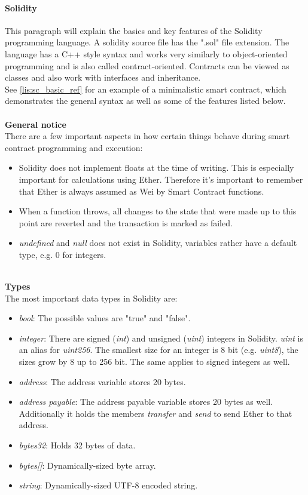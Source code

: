 \paragraph{Solidity}
This paragraph will explain the basics and key features of the Solidity programming language.
A solidity source file has the ".sol" file extension. The language has a C++ style syntax and works very similarly to object-oriented programming and is also called contract-oriented\cite{doc-oriented}. Contracts can be viewed as classes and also work with interfaces and inheritance.
\\
See \ref{lis:sc_basic_ref} for an example of a minimalistic smart contract, which demonstrates the general syntax as well as some of the features listed below.
\\\\
\textbf{General notice}\\
There are a few important aspects in how certain things behave during smart contract programming and execution:
\begin{itemize}
  \item Solidity does not implement floats at the time of writing. This is especially important for calculations using Ether. Therefore it’s important to remember that Ether is always assumed as Wei by Smart Contract functions.
  \item When a function throws, all changes to the state that were made up to this point are reverted and the transaction is marked as failed.
  \item \textit{undefined} and \textit{null} does not exist in Solidity, variables rather have a default type, e.g. 0 for integers\cite{doc-types}.
\end{itemize}
\leavevmode
\\
\textbf{Types}\\
The most important data types in Solidity are\cite{doc-types}:
\begin{itemize}
  \item \textit{bool}: The possible values are "true" and "false".
  \item \textit{integer}: There are signed (\textit{int}) and unsigned (\textit{uint}) integers in Solidity. \textit{uint} is an alias for \textit{uint256}. The smallest size for an integer is 8 bit (e.g. \textit{uint8}), the sizes grow by 8 up to 256 bit. The same applies to signed integers as well.
  \item \textit{address}: The address variable stores 20 bytes.
  \item \textit{address payable}: The address payable variable stores 20 bytes as well. Additionally it holds the members \textit{transfer} and \textit{send} to send Ether to that address.
  \item \textit{bytes32}: Holds 32 bytes of data.
  \item \textit{bytes[]}: Dynamically-sized byte array.
  \item \textit{string}: Dynamically-sized UTF-8 encoded string.
\end{itemize}
